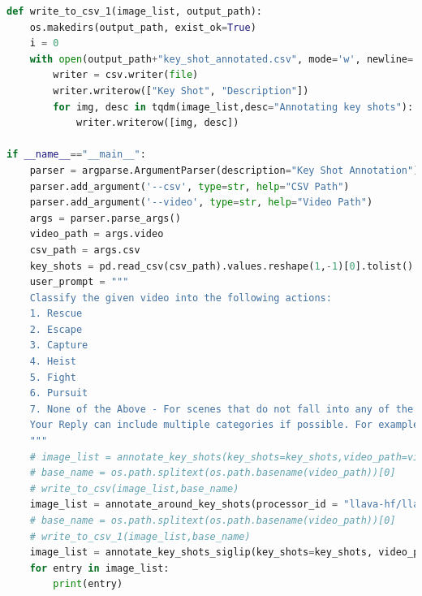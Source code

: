 \documentclass[12pt]{report}
\begin{document}
\begin{lstlisting}[language=Python,caption={LLM Inference Code}]
def write_to_csv_1(image_list, output_path):
    os.makedirs(output_path, exist_ok=True)
    i = 0
    with open(output_path+"key_shot_annotated.csv", mode='w', newline='', encoding='utf-8') as file:
        writer = csv.writer(file)
        writer.writerow(["Key Shot", "Description"])
        for img, desc in tqdm(image_list,desc="Annotating key shots"):
            writer.writerow([img, desc])
            
if __name__=="__main__":
    parser = argparse.ArgumentParser(description="Key Shot Annotation")
    parser.add_argument('--csv', type=str, help="CSV Path")
    parser.add_argument('--video', type=str, help="Video Path")
    args = parser.parse_args()
    video_path = args.video
    csv_path = args.csv
    key_shots = pd.read_csv(csv_path).values.reshape(1,-1)[0].tolist()
    user_prompt = """
    Classify the given video into the following actions:
    1. Rescue
    2. Escape 
    3. Capture 
    4. Heist
    5. Fight
    6. Pursuit
    7. None of the Above - For scenes that do not fall into any of the aforementioned categories.
    Your Reply can include multiple categories if possible. For example, a scene can have Rescue and Escape.
    """
    # image_list = annotate_key_shots(key_shots=key_shots,video_path=video_path,user_prompt=user_prompt)
    # base_name = os.path.splitext(os.path.basename(video_path))[0]
    # write_to_csv(image_list,base_name)
    image_list = annotate_around_key_shots(processor_id = "llava-hf/llava-interleave-qwen-0.5b-hf",model_id = "asgaard-model-finetuning-results-abhishek/checkpoint-240",key_shots=key_shots,video_path=video_path,user_prompt=user_prompt)
    # base_name = os.path.splitext(os.path.basename(video_path))[0]
    # write_to_csv_1(image_list,base_name)
    image_list = annotate_key_shots_siglip(key_shots=key_shots, video_path=video_path)
    for entry in image_list:
        print(entry)
    




	\end{lstlisting}
\end{document}
